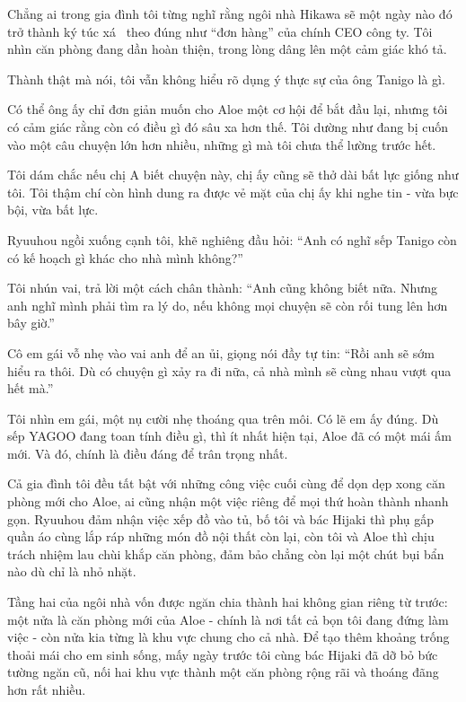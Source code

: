 \documentclass[../main.tex]{subfiles}
\begin{document}
Chẳng ai trong gia đình tôi từng nghĩ rằng ngôi nhà Hikawa sẽ một ngày nào đó trở thành ký túc xá \hll\ theo đúng như ``đơn hàng'' của chính CEO công ty. Tôi nhìn căn phòng đang dần hoàn thiện, trong lòng dâng lên một cảm giác khó tả.

Thành thật mà nói, tôi vẫn không hiểu rõ dụng ý thực sự của ông Tanigo là gì.

Có thể ông ấy chỉ đơn giản muốn cho Aloe một cơ hội để bắt đầu lại, nhưng tôi có cảm giác rằng còn có điều gì đó sâu xa hơn thế. Tôi dường như đang bị cuốn vào một câu chuyện lớn hơn nhiều, những gì mà tôi chưa thể lường trước hết.

Tôi dám chắc nếu chị A biết chuyện này, chị ấy cũng sẽ thở dài bất lực giống như tôi. Tôi thậm chí còn hình dung ra được vẻ mặt của chị ấy khi nghe tin - vừa bực bội, vừa bất lực.

Ryuuhou ngồi xuống cạnh tôi, khẽ nghiêng đầu hỏi: ``Anh có nghĩ sếp Tanigo còn có kế hoạch gì khác cho nhà mình không?''

Tôi nhún vai, trả lời một cách chân thành: ``Anh cũng không biết nữa. Nhưng anh nghĩ mình phải tìm ra lý do, nếu không mọi chuyện sẽ còn rối tung lên hơn bây giờ.''

Cô em gái vỗ nhẹ vào vai anh để an ủi, giọng nói đầy tự tin: ``Rồi anh sẽ sớm hiểu ra thôi. Dù có chuyện gì xảy ra đi nữa, cả nhà mình sẽ cùng nhau vượt qua hết mà.''

Tôi nhìn em gái, một nụ cười nhẹ thoáng qua trên môi. Có lẽ em ấy đúng. Dù sếp YAGOO đang toan tính điều gì, thì ít nhất hiện tại, Aloe đã có một mái ấm mới. Và đó, chính là điều đáng để trân trọng nhất.

\ct

Cả gia đình tôi đều tất bật với những công việc cuối cùng để dọn dẹp xong căn phòng mới cho Aloe, ai cũng nhận một việc riêng để mọi thứ hoàn thành nhanh gọn. Ryuuhou đảm nhận việc xếp đồ vào tủ, bố tôi và bác Hijaki thì phụ gấp quần áo cùng lắp ráp những món đồ nội thất còn lại, còn tôi và Aloe thì chịu trách nhiệm lau chùi khắp căn phòng, đảm bảo chẳng còn lại một chút bụi bẩn nào dù chỉ là nhỏ nhặt.

Tầng hai của ngôi nhà vốn được ngăn chia thành hai không gian riêng từ trước: một nửa là căn phòng mới của Aloe - chính là nơi tất cả bọn tôi đang đứng làm việc - còn nửa kia từng là khu vực chung cho cả nhà. Để tạo thêm khoảng trống thoải mái cho em sinh sống, mấy ngày trước tôi cùng bác Hijaki đã dỡ bỏ bức tường ngăn cũ, nối hai khu vực thành một căn phòng rộng rãi và thoáng đãng hơn rất nhiều.
\end{document}
